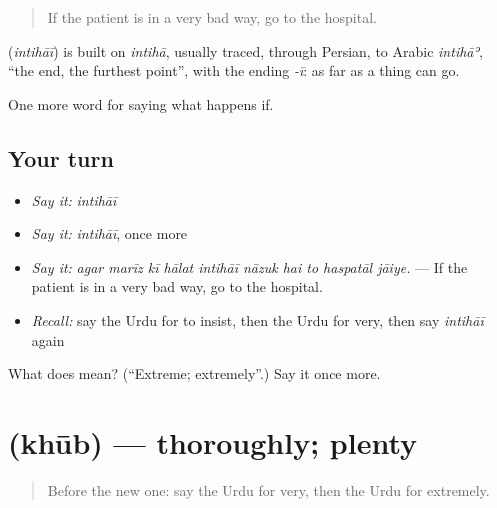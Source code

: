 \begin{quote}
If the patient is in a very bad way, go to the hospital.
\end{quote}

\begin{cousinweb}
\textbf{} (\emph{intihāī}) is built on \emph{intihā}, usually traced, through Persian, to Arabic \emph{intihāʾ}, \textquotedblleft{}the end, the furthest point\textquotedblright{}, with the ending \emph{-ī}: as far as a thing can go.
\end{cousinweb}

\begin{grammarlens}[title={What you've built}]
One more word for saying what happens if.
\end{grammarlens}

\subsection*{Your turn}
\begin{itemize}
\raggedright
  \item \emph{Say it:} \emph{intihāī}
  \item \emph{Say it:} \emph{intihāī}, once more
  \item \emph{Say it:} \emph{agar marīz kī hālat intihāī nāzuk hai to haspatāl jāiye.} — If the patient is in a very bad way, go to the hospital.
  \item \emph{Recall:} say the Urdu for to insist, then the Urdu for very, then say \emph{intihāī} again
\end{itemize}

\begin{tcolorbox}[breakable,colback=teal!4,colframe=teal!35!black,title={Before you move on}]
What does  mean? (\textquotedblleft{}Extreme; extremely\textquotedblright{}.) Say it once more.
\end{tcolorbox}
\section[\texorpdfstring{\ur{خوب} (khūb)}{خوب (khūb)}]{ (khūb) — thoroughly; plenty}

\label{lesson:UR-C375-khub}



\begin{quote}
Before the new one: say the Urdu for very, then the Urdu for extremely.
\end{quote}

